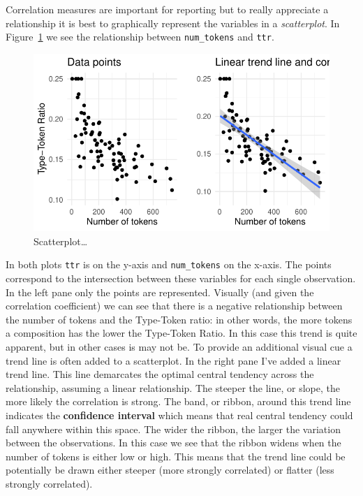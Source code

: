 \documentclass[
  letterpaper,
]{scrbook}
\begin{document}
Correlation measures are important for reporting but to really
appreciate a relationship it is best to graphically represent the
variables in a \emph{scatterplot}. In
Figure~\ref{fig-summaries-bivariate-scatterplot-belc} we see the
relationship between \texttt{num\_tokens} and \texttt{ttr}.

\begin{figure}[h]

{\centering \includegraphics{./approaching-analysis_files/figure-pdf/fig-summaries-bivariate-scatterplot-belc-1.pdf}

}

\caption{\label{fig-summaries-bivariate-scatterplot-belc}Scatterplot\ldots{}}

\end{figure}

In both plots \texttt{ttr} is on the y-axis and \texttt{num\_tokens} on
the x-axis. The points correspond to the intersection between these
variables for each single observation. In the left pane only the points
are represented. Visually (and given the correlation coefficient) we can
see that there is a negative relationship between the number of tokens
and the Type-Token ratio: in other words, the more tokens a composition
has the lower the Type-Token Ratio. In this case this trend is quite
apparent, but in other cases is may not be. To provide an additional
visual cue a trend line is often added to a scatterplot. In the right
pane I've added a linear trend line. This line demarcates the optimal
central tendency across the relationship, assuming a linear
relationship. The steeper the line, or slope, the more likely the
correlation is strong. The band, or ribbon, around this trend line
indicates the \textbf{confidence interval} which means that real central
tendency could fall anywhere within this space. The wider the ribbon,
the larger the variation between the observations. In this case we see
that the ribbon widens when the number of tokens is either low or high.
This means that the trend line could be potentially be drawn either
steeper (more strongly correlated) or flatter (less strongly
correlated).
\end{document}

